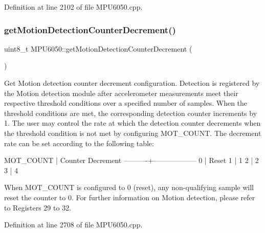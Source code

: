 Definition at line 2102 of file M\+P\+U6050.\+cpp.


\begin{DoxyCode}{0}

\end{DoxyCode}
\mbox{\label{classMPU6050_a0ed8de8eb440dbfdec829297527b0da6}} 
\subsubsection{\texorpdfstring{getMotionDetectionCounterDecrement()}{getMotionDetectionCounterDecrement()}}
{\footnotesize\ttfamily uint8\+\_\+t M\+P\+U6050\+::get\+Motion\+Detection\+Counter\+Decrement (\begin{DoxyParamCaption}{ }\end{DoxyParamCaption})}

Get Motion detection counter decrement configuration. Detection is registered by the Motion detection module after accelerometer measurements meet their respective threshold conditions over a specified number of samples. When the threshold conditions are met, the corresponding detection counter increments by 1. The user may control the rate at which the detection counter decrements when the threshold condition is not met by configuring M\+O\+T\+\_\+\+C\+O\+U\+NT. The decrement rate can be set according to the following table\+:


\begin{DoxyPre}
MOT\_COUNT | Counter Decrement
----------+------------------
0         | Reset
1         | 1
2         | 2
3         | 4
\end{DoxyPre}


When M\+O\+T\+\_\+\+C\+O\+U\+NT is configured to 0 (reset), any non-\/qualifying sample will reset the counter to 0. For further information on Motion detection, please refer to Registers 29 to 32. 

Definition at line 2708 of file M\+P\+U6050.\+cpp.


